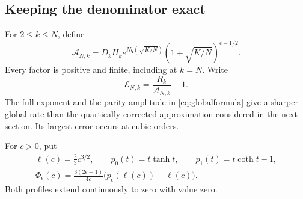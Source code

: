 \subsection{Keeping the denominator exact}

For $2\le k\le N$, define
\begin{equation}\label{eq:globalformula}
\mathcal A_{N,k}
=D_kH_k e^{Nq(\sqrt{K/N})}
(1+\sqrt{K/N})^{\epsilon-1/2}.
\end{equation}
Every factor is positive and finite, including at $k=N$. Write
\[
\mathcal E_{N,k}=\frac{R_k}{\mathcal A_{N,k}}-1.
\]
The full exponent and the parity amplitude in \eqref{eq:globalformula} give a sharper global rate than the quartically corrected approximation considered in the next section. Its largest error occurs at cubic orders.

For $c>0$, put
\begin{equation}\label{eq:globalprofiledef}
\begin{gathered}
\ell(c)=\frac23c^{3/2},\qquad
p_0(t)=t\tanh t,\qquad p_1(t)=t\coth t-1,\\
\Phi_\epsilon(c)=\frac{3(2\epsilon-1)}{4c}
\bigl(p_\epsilon(\ell(c))-\ell(c)\bigr).
\end{gathered}
\end{equation}
Both profiles extend continuously to zero with value zero.

